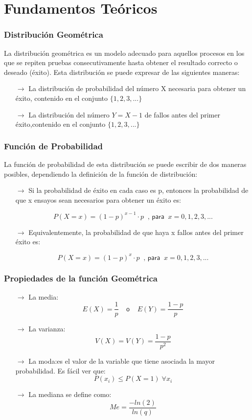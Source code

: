 \documentclass{beamer}
\begin{document}
\section {Fundamentos Teóricos}
\begin{frame}
\frametitle{Distribución Geométrica}
La distribución geométrica es un modelo adecuado para aquellos procesos en los que se repiten pruebas consecutivamente hasta obtener el resultado correcto o deseado (éxito).
Esta distribución se puede expresar de las siguientes maneras:
\begin{itemize}
\item[$\rightarrow$]La distribución de probabilidad del número X necesaria para obtener un éxito, contenido en el conjunto $\lbrace 1,2,3,... \rbrace$ \pause
\item[$\rightarrow$]La distribución del número $Y=X-1$ de fallos antes del primer éxito,contenido en el conjunto $\lbrace 1,2,3,... \rbrace$
\end{itemize}
\end{frame}
\begin{frame}
\frametitle{Función de Probabilidad}
La función de probabilidad de esta distribución se puede escribir de dos maneras posibles, dependiendo la definición de la función de distribución:
\begin{itemize}
\item[$\rightarrow$]Si la probabilidad de éxito en cada caso es p, entonces la probabilidad de que x ensayos sean necesarios para obtener un éxito es: \pause
\begin{block}{}
\[P(X=x)=(1-p)^{x-1} \cdot p \;\; \textsf{, para} \;\; x=0,1,2,3,...\]
\end{block} \pause
\item[$\rightarrow$]Equivalentemente, la probabilidad de que haya x fallos antes del primer éxito es: \pause
\begin{block}{}
\[P(X=x)=(1-p)^{x} \cdot p \;\; \textsf{, para} \;\; x=0,1,2,3,...\]
\end{block}
\end{itemize}
\end{frame}
\begin{frame}
\frametitle{Propiedades de la función Geométrica}
\begin{itemize}
\item[$\rightarrow$]La media:
\[ E(X) = \frac{1}{p} \;\;\;\; \textsf{o} \;\;\;\; E(Y) = \frac{1-p}{p}\] \pause
\item[$\rightarrow$]La varianza:
\[ V(X) = V(Y) = \frac{1-p}{p^2}\] \pause
\item[$\rightarrow$]La moda:es el valor de la variable que tiene asociada la mayor probabilidad. Es fácil ver que:
\[P(x_i) \leq P(X=1) \;\forall x_i \] \pause
\item[$\rightarrow$]La mediana se define como:
\[Me = \frac{-ln(2)}{ln(q)}\]
\end{itemize}
\end{frame}
\end{document}
